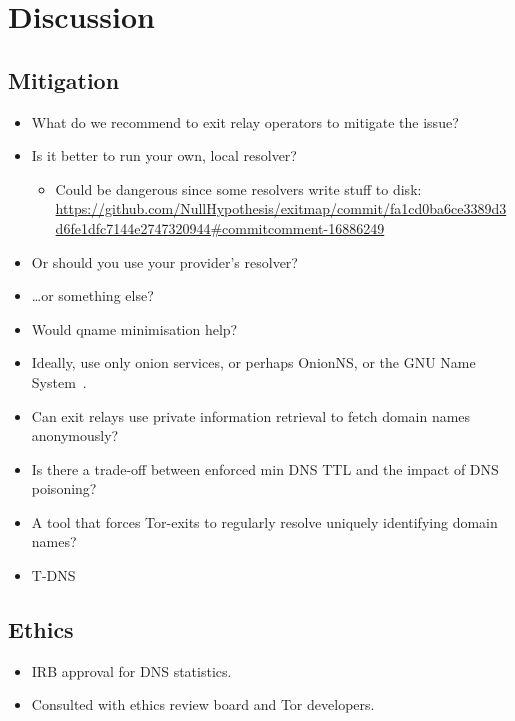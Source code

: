\section{Discussion}
\label{sec:discussion}

\subsection{Mitigation}
\begin{itemize}
	\item What do we recommend to exit relay operators to mitigate the issue?
	\item Is it better to run your own, local resolver?
		\begin{itemize}
			\item Could be dangerous since some resolvers write stuff to disk:
		\url{https://github.com/NullHypothesis/exitmap/commit/fa1cd0ba6ce3389d3d6fe1dfc7144e2747320944#commitcomment-16886249}
		\end{itemize}
	\item Or should you use your provider's resolver?
	\item \ldots or something else?
	\item Would qname minimisation help?
	\item Ideally, use only onion services, or perhaps OnionNS, or the GNU Name
		System~\cite{Wachs2014a}.
	\item Can exit relays use private information retrieval to fetch domain
		names anonymously?
	\item Is there a trade-off between enforced min DNS TTL and the impact of
		DNS poisoning?
	\item A tool that forces Tor-exits to regularly resolve uniquely identifying
		domain names?
	\item T-DNS~\cite{Zhu2015a}
\end{itemize}

\subsection{Ethics}
\begin{itemize}
	\item IRB approval for DNS statistics.
	\item Consulted with ethics review board and Tor developers.
\end{itemize}
